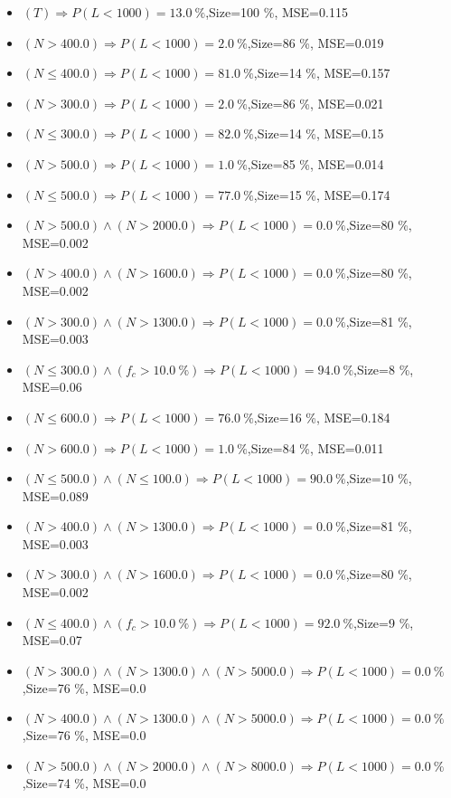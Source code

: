 \documentclass[numbered]{CSL}
\begin{document}
\begin{itemize}
\item $(T) \Rightarrow P(L < 1 000) = 13.0~\%$,\hfill Size=100 \%, MSE=0.115
\item $(N > 400.0) \Rightarrow P(L < 1 000) = 2.0~\%$,\hfill Size=86 \%, MSE=0.019
\item $(N \leq 400.0) \Rightarrow P(L < 1 000) = 81.0~\%$,\hfill Size=14 \%, MSE=0.157
\item $(N > 300.0) \Rightarrow P(L < 1 000) = 2.0~\%$,\hfill Size=86 \%, MSE=0.021
\item $(N \leq 300.0) \Rightarrow P(L < 1 000) = 82.0~\%$,\hfill Size=14 \%, MSE=0.15
\item $(N > 500.0) \Rightarrow P(L < 1 000) = 1.0~\%$,\hfill Size=85 \%, MSE=0.014
\item $(N \leq 500.0) \Rightarrow P(L < 1 000) = 77.0~\%$,\hfill Size=15 \%, MSE=0.174
\item $(N > 500.0) \land (N > 2000.0) \Rightarrow P(L < 1 000) = 0.0~\%$,\hfill Size=80 \%, MSE=0.002
\item $(N > 400.0) \land (N > 1600.0) \Rightarrow P(L < 1 000) = 0.0~\%$,\hfill Size=80 \%, MSE=0.002
\item $(N > 300.0) \land (N > 1300.0) \Rightarrow P(L < 1 000) = 0.0~\%$,\hfill Size=81 \%, MSE=0.003
\item $(N \leq 300.0) \land (f_c > 10.0~\%) \Rightarrow P(L < 1 000) = 94.0~\%$,\hfill Size=8 \%, MSE=0.06
\item $(N \leq 600.0) \Rightarrow P(L < 1 000) = 76.0~\%$,\hfill Size=16 \%, MSE=0.184
\item $(N > 600.0) \Rightarrow P(L < 1 000) = 1.0~\%$,\hfill Size=84 \%, MSE=0.011
\item $(N \leq 500.0) \land (N \leq 100.0) \Rightarrow P(L < 1 000) = 90.0~\%$,\hfill Size=10 \%, MSE=0.089
\item $(N > 400.0) \land (N > 1300.0) \Rightarrow P(L < 1 000) = 0.0~\%$,\hfill Size=81 \%, MSE=0.003
\item $(N > 300.0) \land (N > 1600.0) \Rightarrow P(L < 1 000) = 0.0~\%$,\hfill Size=80 \%, MSE=0.002
\item $(N \leq 400.0) \land (f_c > 10.0~\%) \Rightarrow P(L < 1 000) = 92.0~\%$,\hfill Size=9 \%, MSE=0.07
\item $(N > 300.0) \land (N > 1300.0) \land (N > 5000.0) \Rightarrow P(L < 1 000) = 0.0~\%$,\hfill Size=76 \%, MSE=0.0
\item $(N > 400.0) \land (N > 1300.0) \land (N > 5000.0) \Rightarrow P(L < 1 000) = 0.0~\%$,\hfill Size=76 \%, MSE=0.0
\item $(N > 500.0) \land (N > 2000.0) \land (N > 8000.0) \Rightarrow P(L < 1 000) = 0.0~\%$,\hfill Size=74 \%, MSE=0.0
\end{itemize}
\end{document}
